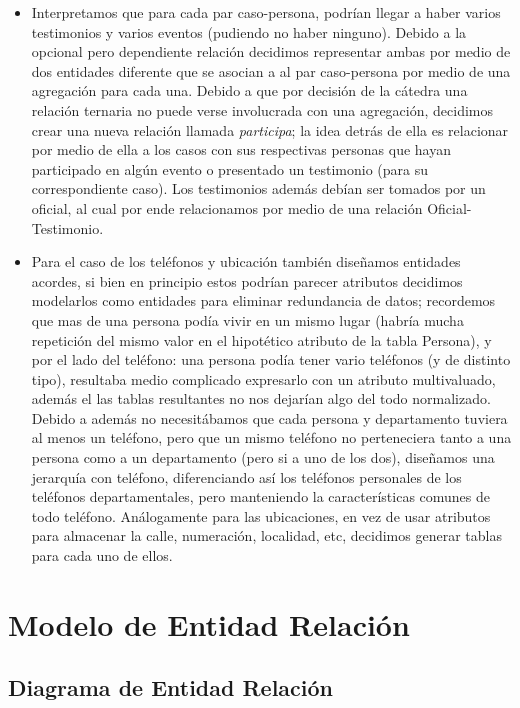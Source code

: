 \documentclass{article}
\theoremstyle{definition}
\theoremstyle{remark}
\begin{document}
\begin{itemize}
\item Interpretamos que para cada par caso-persona, podrían llegar a haber varios testimonios y varios eventos (pudiendo no haber ninguno). Debido a la opcional pero dependiente relación decidimos representar ambas por medio de dos entidades diferente que se asocian a al par caso-persona por medio de una agregación para cada una. Debido a que por decisión de la cátedra una relación ternaria no puede verse involucrada con una agregación, decidimos crear una nueva relación llamada \textit{participa}; la idea detrás de ella es relacionar por medio de ella a los casos con sus respectivas personas que hayan participado en algún evento o presentado un testimonio (para su correspondiente caso). Los testimonios además debían ser tomados por un oficial, al cual por ende relacionamos por medio de una relación Oficial-Testimonio.

\item Para el caso de los teléfonos y ubicación también diseñamos entidades acordes, si bien en principio estos podrían parecer atributos decidimos modelarlos como entidades para eliminar redundancia de datos; recordemos que mas de una persona podía vivir en un mismo lugar (habría mucha repetición del mismo valor en el hipotético atributo de la tabla Persona), y por el lado del teléfono: una persona podía tener vario teléfonos (y de distinto tipo), resultaba medio complicado expresarlo con un atributo multivaluado, además el las tablas resultantes no nos dejarían algo del todo normalizado. Debido a además no necesitábamos que cada persona y departamento tuviera al menos un teléfono, pero que un mismo teléfono no perteneciera tanto a una persona como a un departamento (pero si a uno de los dos), diseñamos una jerarquía con teléfono, diferenciando así los teléfonos personales de los teléfonos departamentales, pero manteniendo la características comunes de todo teléfono. Análogamente para las ubicaciones, en vez de usar atributos para almacenar la calle, numeración, localidad, etc, decidimos generar tablas para cada uno de ellos.
\end{itemize}

\pagebreak

\section{Modelo de Entidad Relación}

\subsection{Diagrama de Entidad Relación}
\end{document}
